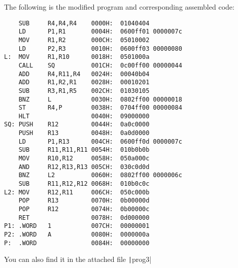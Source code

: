 \documentclass[answers]{exam}
\begin{document}
\begin{questions}
    \begin{solution}
        The following is the modified program and corresponding assembled code:
        \begin{verbatim}
    SUB     R4,R4,R4    0000H:  01040404
    LD      P1,R1       0004H:  0600ff01 0000007c
    MOV     R1,R2       000CH:  05010002
    LD      P2,R3       0010H:  0600ff03 00000080
L:  MOV     R1,R10      0018H:  0501000a
    CALL    SQ          001CH:  0c00ff00 00000044
    ADD     R4,R11,R4   0024H:  00040b04
    ADD     R1,R2,R1    0028H:  00010201
    SUB     R3,R1,R5    002CH:  01030105
    BNZ     L           0030H:  0802ff00 00000018
    ST      R4,P        0038H:  0704ff00 00000084
    HLT                 0040H:  09000000
SQ: PUSH    R12         0044H:  0a0c0000
    PUSH    R13         0048H:  0a0d0000
    LD      P1,R13      004CH:  0600ff0d 0000007c
    SUB     R11,R11,R11 0054H:  010b0b0b
    MOV     R10,R12     0058H:  050a000c
    AND     R12,R13,R13 005CH:  030c0d0d
    BNZ     L2          0060H:  0802ff00 0000006c
    SUB     R11,R12,R12 0068H:  010b0c0c
L2: MOV     R12,R11     006CH:  050c000b
    POP     R13         0070H:  0b00000d
    POP     R12         0074H:  0b00000c
    RET                 0078H:  0d000000
P1: .WORD   1           007CH:  00000001
P2: .WORD   A           0080H:  0000000a
P:  .WORD               0084H:  00000000
        \end{verbatim}
        You can also find it in the attached file \texttt|prog3|
    \end{solution}

\end{questions}
\end{document}
